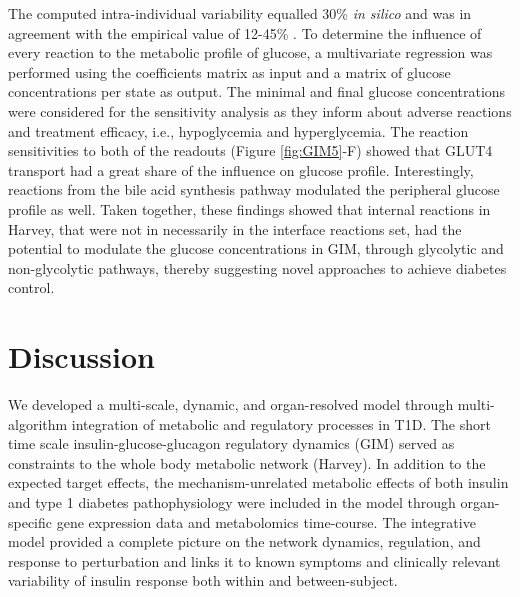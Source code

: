 The computed intra-individual variability equalled 30\% \textit{in silico} and was in agreement with the empirical value of 12-45\% \cite{heinemann2002variability}. To determine the influence of every reaction to the metabolic profile of glucose, a multivariate regression was performed using the coefficients matrix as input and a matrix of glucose concentrations per state as output. The minimal and final glucose concentrations were considered for the sensitivity analysis as they inform about adverse reactions and treatment efficacy, i.e., hypoglycemia and hyperglycemia. The reaction sensitivities to both of the readouts (Figure \ref{fig:GIM5}-F) showed that GLUT4 transport had a great share of the influence on glucose profile. Interestingly, reactions from the bile acid synthesis pathway modulated the peripheral glucose profile as well.  Taken together, these findings showed that internal reactions in Harvey, that were not in necessarily in the interface reactions set, had the potential to modulate the glucose concentrations in GIM, through glycolytic and non-glycolytic pathways, thereby suggesting novel approaches to achieve diabetes control.
\section{Discussion}
We developed a multi-scale, dynamic, and organ-resolved model through multi-algorithm integration of metabolic and regulatory processes in T1D. The short time scale insulin-glucose-glucagon regulatory dynamics (GIM) served as constraints to the whole body metabolic network (Harvey). In addition to the expected target effects, the mechanism-unrelated metabolic effects of both insulin and type 1 diabetes pathophysiology were included in the model through organ-specific gene expression data and metabolomics time-course. The integrative model provided a complete picture on the network dynamics, regulation, and response to perturbation and links it to known symptoms and clinically relevant variability of insulin response both within and between-subject.  
